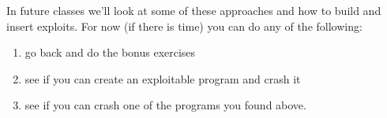\documentclass{article}
\begin{document}
\noindent In future classes we'll look at some of these approaches and how to build and insert exploits. For now (if there is time) you can do any of the following:
\begin{enumerate}
    \item go back and do the bonus exercises
    \item see if you can create an exploitable program and crash it
    \item see if you can crash one of the programs you found above.
\end{enumerate}
% 
% 
\end{document}
